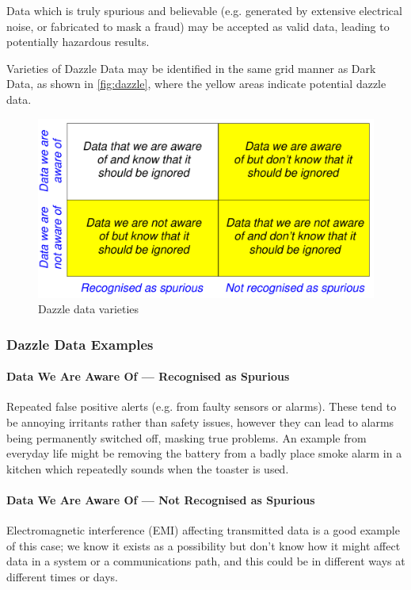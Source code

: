 Data which is truly spurious and believable (e.g. generated by extensive electrical noise, or fabricated to mask a fraud) may be accepted as valid data, leading to potentially hazardous results. 

Varieties of Dazzle Data may be identified in the same grid manner as Dark Data, as shown in \autoref{fig:dazzle}, where the yellow areas indicate potential dazzle data.

\begin{figure}[htbp]
  \centering
  \includegraphics[width=\textwidth/2]{images/dazzleknowns.pdf}
  \caption{Dazzle data varieties}
  \label{fig:dazzle}
\end{figure}

\clearpage
\subsubsection{Dazzle Data Examples}

\paragraph{Data We Are Aware Of --- Recognised as Spurious}
Repeated false positive alerts (e.g. from faulty sensors or alarms). These tend to be annoying irritants rather than safety issues, however they can lead to alarms being permanently switched off, masking true problems. An example from everyday life might be removing the battery from a badly place smoke alarm in a kitchen which repeatedly sounds when the toaster is used.

\paragraph{Data We Are Aware Of --- Not Recognised as Spurious}
Electromagnetic interference (EMI) affecting transmitted data is a good example of this case; we know it exists as a possibility but don't know how it might affect data in a system or a communications path, and this could be in different ways at different times or days.


